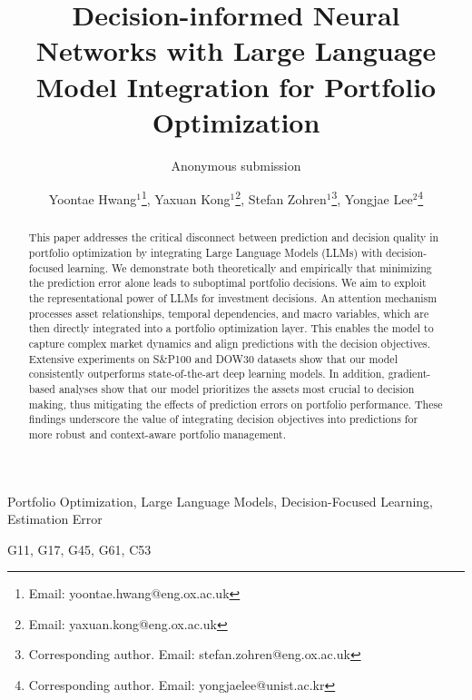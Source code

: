 \documentclass{style}
\begin{document}
\title{Decision-informed Neural Networks with Large Language Model Integration for Portfolio Optimization}


\author{Anonymous submission}

\author{{Yoontae Hwang$^{1}$\thanks{Email: yoontae.hwang@eng.ox.ac.uk},
Yaxuan Kong$^{1}$\thanks{Email: yaxuan.kong@eng.ox.ac.uk},
Stefan Zohren$^{1}$\thanks{Corresponding author. Email: stefan.zohren@eng.ox.ac.uk},
Yongjae Lee$^{2}$\thanks{Corresponding author. Email: yongjaelee@unist.ac.kr}}
}



\maketitle

\begin{abstract}
This paper addresses the critical disconnect between prediction and decision quality in portfolio optimization by integrating Large Language Models (LLMs) with decision-focused learning. We demonstrate both theoretically and empirically that minimizing the prediction error alone leads to suboptimal portfolio decisions. We aim to exploit the representational power of LLMs for investment decisions. An attention mechanism processes asset relationships, temporal dependencies, and macro variables, which are then directly integrated into a portfolio optimization layer. This enables the model to capture complex market dynamics and align predictions with the decision objectives. Extensive experiments on S\&P100 and DOW30 datasets show that our model consistently outperforms state-of-the-art deep learning models. In addition, gradient-based analyses show that our model prioritizes the assets most crucial to decision making, thus mitigating the effects of prediction errors on portfolio performance. These findings underscore the value of integrating decision objectives into predictions for more robust and context-aware portfolio management.

\end{abstract}

\begin{keywords} Portfolio Optimization, Large Language Models, Decision-Focused Learning, Estimation Error
\end{keywords}

\begin{classcode} G11, G17, G45, G61, C53 \end{classcode}
\end{document}
